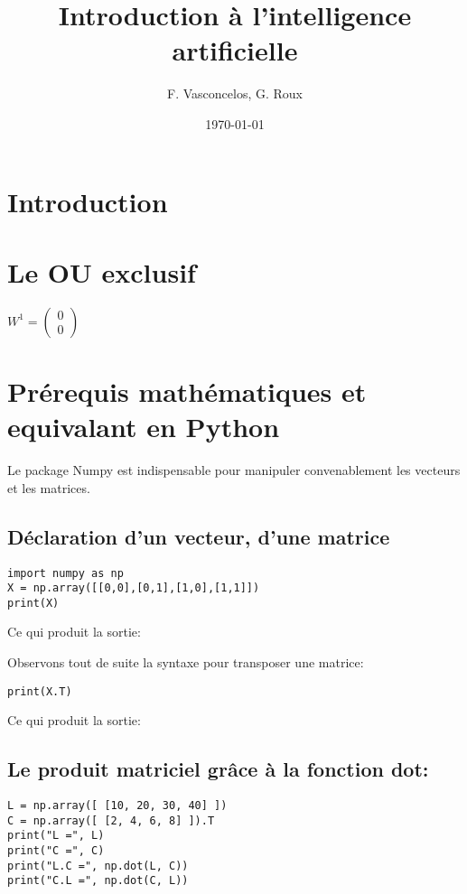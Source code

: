 \documentclass[11pt]{article}
\author{F. Vasconcelos, G. Roux}
\date{\today}
\title{Introduction à l'intelligence artificielle}
\begin{document}
\maketitle
\tableofcontents



\section{Introduction}
\label{sec-1}

\section{Le OU exclusif}
\label{sec-2}

$W^{1}=\begin{pmatrix}0\\0\end{pmatrix}$

\section{Prérequis mathématiques et equivalant en Python}
\label{sec-3}

Le package Numpy est indispensable pour manipuler convenablement les vecteurs
et les matrices.

\subsection{Déclaration d'un vecteur, d'une matrice}
\label{sec-3-1}

\begin{verbatim}
import numpy as np
X = np.array([[0,0],[0,1],[1,0],[1,1]])
print(X)
\end{verbatim}

Ce qui produit la sortie:

Observons tout de suite la syntaxe pour transposer une matrice:

\begin{verbatim}
print(X.T)
\end{verbatim}

Ce qui produit la sortie:

\subsection{Le produit matriciel grâce à la fonction dot:}
\label{sec-3-2}

\begin{verbatim}
L = np.array([ [10, 20, 30, 40] ])
C = np.array([ [2, 4, 6, 8] ]).T
print("L =", L)
print("C =", C)
print("L.C =", np.dot(L, C))
print("C.L =", np.dot(C, L))
\end{verbatim}
\end{document}
